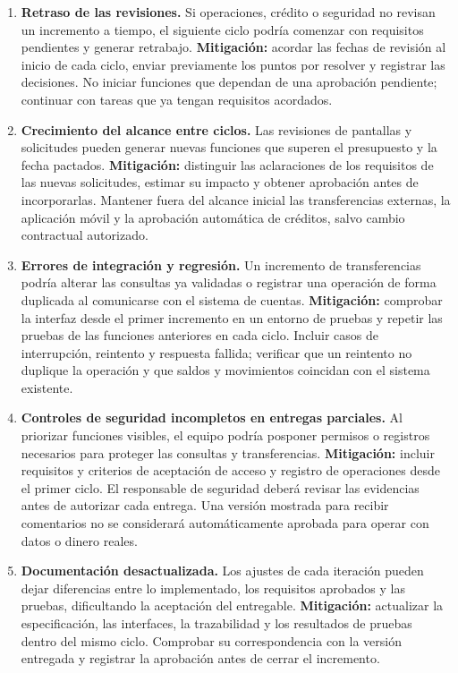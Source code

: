 \begin{enumerate}
    \item \textbf{Retraso de las revisiones.} Si operaciones, crédito o seguridad no revisan un incremento a tiempo, el siguiente ciclo podría comenzar con requisitos pendientes y generar retrabajo. \textbf{Mitigación:} acordar las fechas de revisión al inicio de cada ciclo, enviar previamente los puntos por resolver y registrar las decisiones. No iniciar funciones que dependan de una aprobación pendiente; continuar con tareas que ya tengan requisitos acordados.

    \item \textbf{Crecimiento del alcance entre ciclos.} Las revisiones de pantallas y solicitudes pueden generar nuevas funciones que superen el presupuesto y la fecha pactados. \textbf{Mitigación:} distinguir las aclaraciones de los requisitos de las nuevas solicitudes, estimar su impacto y obtener aprobación antes de incorporarlas. Mantener fuera del alcance inicial las transferencias externas, la aplicación móvil y la aprobación automática de créditos, salvo cambio contractual autorizado.

    \item \textbf{Errores de integración y regresión.} Un incremento de transferencias podría alterar las consultas ya validadas o registrar una operación de forma duplicada al comunicarse con el sistema de cuentas. \textbf{Mitigación:} comprobar la interfaz desde el primer incremento en un entorno de pruebas y repetir las pruebas de las funciones anteriores en cada ciclo. Incluir casos de interrupción, reintento y respuesta fallida; verificar que un reintento no duplique la operación y que saldos y movimientos coincidan con el sistema existente.

    \item \textbf{Controles de seguridad incompletos en entregas parciales.} Al priorizar funciones visibles, el equipo podría posponer permisos o registros necesarios para proteger las consultas y transferencias. \textbf{Mitigación:} incluir requisitos y criterios de aceptación de acceso y registro de operaciones desde el primer ciclo. El responsable de seguridad deberá revisar las evidencias antes de autorizar cada entrega. Una versión mostrada para recibir comentarios no se considerará automáticamente aprobada para operar con datos o dinero reales.

    \item \textbf{Documentación desactualizada.} Los ajustes de cada iteración pueden dejar diferencias entre lo implementado, los requisitos aprobados y las pruebas, dificultando la aceptación del entregable. \textbf{Mitigación:} actualizar la especificación, las interfaces, la trazabilidad y los resultados de pruebas dentro del mismo ciclo. Comprobar su correspondencia con la versión entregada y registrar la aprobación antes de cerrar el incremento.
\end{enumerate}
